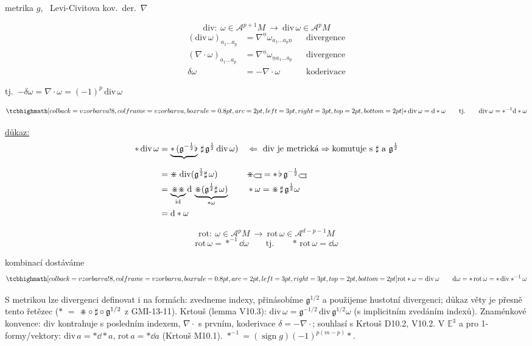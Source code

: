 metrika $g$, \ Levi-Civitova kov.\ der.\ $\nabla$
\begin{definice}[Divergence]
\[
  \mathrm{div}:\ \omega\in\mathcal{A}^{p+1}M \ \to\ \mathrm{div}\,\omega\in\mathcal{A}^pM
\]
\begin{align*}
  (\mathrm{div}\,\omega)_{a_1\dots a_p} &= \nabla^{\underline n}\omega_{a_1\dots a_p\underline n} && \text{divergence} \\
  (\nabla\cdot\omega)_{a_1\dots a_p} &= \nabla^{\underline n}\omega_{\underline n a_1\dots a_p} && \text{divergence} \\
  \delta\omega &= -\nabla\cdot\omega && \text{koderivace}
\end{align*}
\end{definice}
tj.\ \quad $-\delta\omega = \nabla\cdot\omega = (-1)^p\,\mathrm{div}\,\omega$

\begin{veta}[Věta]
\[
  \vzorec{*\,\mathrm{div}\,\omega = \dd*\omega} \qquad\text{tj.}\qquad \mathrm{div}\,\omega = *^{-1}\dd*\omega
\]
\end{veta}
\underline{důkaz:}
\begin{align*}
  *\,\mathrm{div}\,\omega &= \underbrace{*\,(\mathfrak{g}^{-\frac12}\flat}_{}\,\sharp\,\mathfrak{g}^{\frac12}\,\mathrm{div}\,\omega)
  && \Leftarrow\ \text{div je metrická} \Rightarrow \text{komutuje s } \sharp \text{ a } \mathfrak{g}^{\frac12} \\
  &= \gmIhdual\;\mathrm{div}(\mathfrak{g}^{\frac12}\sharp\,\omega)
  && \gmIhdual\gmIhustsym = *\,\flat\,\mathfrak{g}^{-\frac12}\gmIhustsym \\
  &= \underbrace{\gmIhdual\gmIhdual}_{\mathrm{id}}\dd\,\underbrace{\gmIhdual(\mathfrak{g}^{\frac12}\sharp\,\omega)}_{*\omega}
  && *\omega = \gmIhdual\,\sharp\,\mathfrak{g}^{\frac12}\omega \\
  &= \dd*\omega
\end{align*}

\begin{definice}[Rotace]
\[
  \mathrm{rot}:\ \omega\in\mathcal{A}^pM \ \to\ \mathrm{rot}\,\omega\in\mathcal{A}^{d-p-1}M
\]
\[
  \mathrm{rot}\,\omega = *^{-1}\dd\omega \qquad\text{tj.}\qquad *\,\mathrm{rot}\,\omega = \dd\omega
\]
\end{definice}
kombinací dostáváme
\[
  \vzorec{\mathrm{rot}*\omega = \mathrm{div}\,\omega} \qquad \dd\omega = *\,\mathrm{rot}\,\omega = *\,\mathrm{div}*^{-1}\omega
\]

\begin{vysvetleni}
S metrikou lze divergenci definovat i na formách: zvedneme indexy, přinásobíme $\mathfrak g^{1/2}$ a použijeme hustotní divergenci;
důkaz věty je přesně tento řetězec ($*$ $=$ $\mathord{\divideontimes}\circ\sharp\circ\mathfrak g^{1/2}$ z GMI-13-11). Krtouš (lemma V10.3):
$\mathrm{div}\,\omega = \mathfrak g^{-1/2}\,\mathrm{div}\,\mathfrak g^{1/2}\omega$ (s implicitním zvedáním indexů).
Znaménkové konvence: $\mathrm{div}$ kontrahuje s posledním indexem, $\nabla\cdot$ s prvním, koderivace $\delta = -\nabla\cdot$; souhlasí s Krtouš D10.2, V10.2.
V $\mathbb{E}^3$ a pro 1-formy/vektory: $\mathrm{div}\,a = *\dd*a$, $\mathrm{rot}\,a = *\dd a$ (Krtouš M10.1). $*^{-1} = (\operatorname{sign}g)(-1)^{p(m-p)}*$.
\end{vysvetleni}

